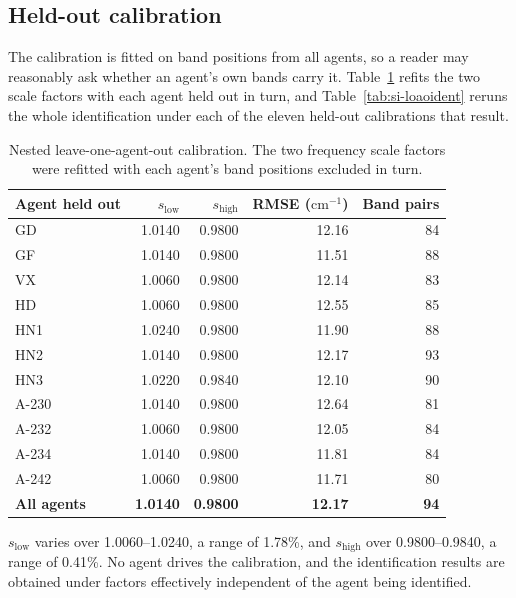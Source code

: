 \documentclass[11pt]{article}
\newcommand*\wn{\ensuremath{\text{cm}^{-1}}}
\begin{document}
\subsection{Held-out calibration}

The calibration is fitted on band positions from all agents, so a reader may reasonably
ask whether an agent's own bands carry it. Table~\ref{tab:si-loao} refits the two scale
factors with each agent held out in turn, and Table~\ref{tab:si-loaoident} reruns the whole
identification under each of the eleven held-out calibrations that result.

\begin{table}[htbp]
\centering
\caption{Nested leave-one-agent-out calibration. The two frequency scale factors were refitted with each agent's band positions excluded in turn.}
\label{tab:si-loao}
\small
\begin{tabular}{lrrrr}
\toprule
Agent held out & $s_\mathrm{low}$ & $s_\mathrm{high}$ & RMSE (\wn) & Band pairs \\
\midrule
GD & 1.0140 & 0.9800 & 12.16 & 84 \\
GF & 1.0140 & 0.9800 & 11.51 & 88 \\
VX & 1.0060 & 0.9800 & 12.14 & 83 \\
HD & 1.0060 & 0.9800 & 12.55 & 85 \\
HN1 & 1.0240 & 0.9800 & 11.90 & 88 \\
HN2 & 1.0140 & 0.9800 & 12.17 & 93 \\
HN3 & 1.0220 & 0.9840 & 12.10 & 90 \\
A-230 & 1.0140 & 0.9800 & 12.64 & 81 \\
A-232 & 1.0060 & 0.9800 & 12.05 & 84 \\
A-234 & 1.0140 & 0.9800 & 11.81 & 84 \\
A-242 & 1.0060 & 0.9800 & 11.71 & 80 \\
\textbf{All agents} & \textbf{1.0140} & \textbf{0.9800} & \textbf{12.17} & \textbf{94} \\
\bottomrule
\end{tabular}

\begin{flushleft}\footnotesize $s_\mathrm{low}$ varies over 1.0060--1.0240, a range of 1.78\%, and $s_\mathrm{high}$ over 0.9800--0.9840, a range of 0.41\%. No agent drives the calibration, and the identification results are obtained under factors effectively independent of the agent being identified.\end{flushleft}
\end{table}
\clearpage
\end{document}
